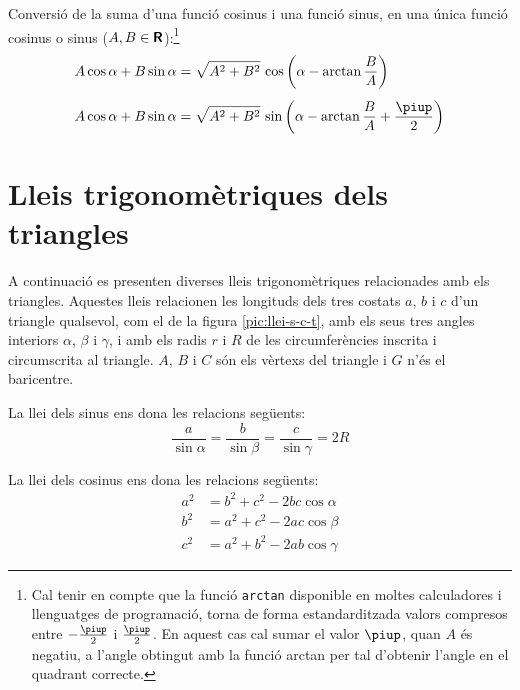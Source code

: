 Conversió de la suma d'una funció cosinus i una funció sinus, en una única
funció cosinus o sinus ($A,B\in{\ensuremath{\boldsymbol{\mathsf{R}}}}$):\footnote{Cal tenir en compte que la funció \texttt{arctan} disponible en moltes calculadores i llenguatges de programació, torna de forma estandarditzada valors compresos entre $-\frac{\piup}{2}$ i $\frac{\piup}{2}$. En aquest cas cal sumar el valor $\piup$, quan $A$ és negatiu, a l'angle obtingut amb la funció \textsf{arctan} per tal d'obtenir l'angle en el quadrant correcte.}
\begin{subequations}
\begin{align}
    A \cos \alpha + B \sin \alpha &= \sqrt{A^2+B^2}\, \cos \left(\alpha - \arctan\dfrac{B}{A}\right)\label{eq:AcosBsin}\\[1ex]
    A \cos \alpha + B \sin \alpha &= \sqrt{A^2+B^2}\, \sin \left(\alpha - \arctan\dfrac{B}{A}+\dfrac{\piup}{2}\right)\label{eq:AcosBsinS}
\end{align}
\end{subequations}


\section{Lleis trigonomètriques dels triangles}\label{sec:llei-s-c-t}

A continuació es presenten diverses lleis trigonomètriques relacionades amb els triangles. Aquestes lleis relacionen les longituds dels tres costats $a$, $b$ i $c$ d'un triangle qualsevol, com el de
la figura \vref{pic:llei-s-c-t}, amb els seus tres angles interiors
$\alpha$, $\beta$ i $\gamma$, i amb els radis $r$ i $R$ de les circumferències inscrita i circumscrita al triangle. $A$, $B$ i $C$ són els vèrtexs del triangle i $G$ n'és el baricentre.

\begin{center}
    
     \label{pic:llei-s-c-t}
\end{center}

La llei dels sinus ens dona les relacions següents:
\begin{equation}
    \frac{a}{\sin\alpha} = \frac{b}{\sin\beta} =
    \frac{c}{\sin\gamma} = 2 R
\end{equation}

La llei dels cosinus ens dona les relacions següents:
\begin{subequations}
\begin{align}
    a^2 &= b^2 + c^2 - 2 b c \cos\alpha \\[1ex]
    b^2 &= a^2 + c^2 - 2 a c \cos\beta \\[1ex]
    c^2 &= a^2 + b^2 - 2 a b \cos\gamma
\end{align}
\end{subequations}

